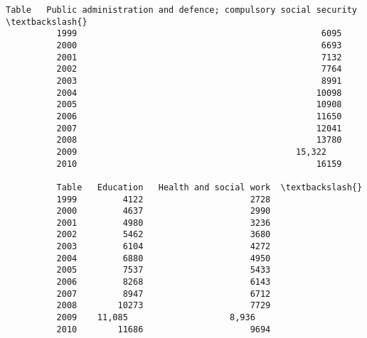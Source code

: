 \documentclass[11pt]{article}
\begin{document}
\begin{Verbatim}[commandchars=\\\{\}]
          Table   Public administration and defence; compulsory social security                                                      \textbackslash{}
          1999                                                6095                                                                    
          2000                                                6693                                                                    
          2001                                                7132                                                                    
          2002                                                7764                                                                    
          2003                                                8991                                                                    
          2004                                               10098                                                                    
          2005                                               10908                                                                    
          2006                                               11650                                                                    
          2007                                               12041                                                                    
          2008                                               13780                                                                    
          2009                                           15,322                                                                       
          2010                                               16159                                                                    
          
          Table   Education   Health and social work  \textbackslash{}
          1999         4122                     2728   
          2000         4637                     2990   
          2001         4980                     3236   
          2002         5462                     3680   
          2003         6104                     4272   
          2004         6880                     4950   
          2005         7537                     5433   
          2006         8268                     6143   
          2007         8947                     6712   
          2008        10273                     7729   
          2009    11,085                    8,936      
          2010        11686                     9694   
          

\end{Verbatim}
\end{document}
